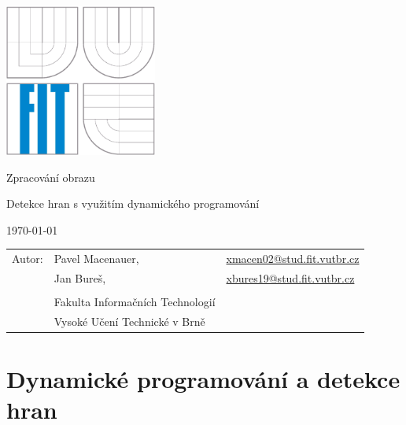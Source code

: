 \documentclass[12pt,a4paper,titlepage,final]{report}
\makeatletter
\newcommand\Course{Zpracování obrazu}
\newcommand\WorkTitle{Detekce hran s využitím dynamického programování}
\newcommand\AuthorA{Pavel Macenauer}
\newcommand\AuthorB{Jan Bureš}
\newcommand\AuthorAEmail{xmacen02@stud.fit.vutbr.cz}
\newcommand\AuthorBEmail{xbures19@stud.fit.vutbr.cz}
\newcommand\Faculty{Fakulta Informačních Technologií}
\newcommand\School{Vysoké Učení Technické v Brně}
\makeatother
\begin{document}
	\begin{titlepage}
	\begin{center}
		\includegraphics[height=5cm]{images/logo.eps}
	\end{center}
	\vfill
	\begin{center}
		\begin{Large}
			\Course\\
		\end{Large}
		\bigskip
		\begin{Huge}
			\WorkTitle\\
		\end{Huge}
	\end{center}
	\vfill
	\begin{center}
		\begin{large}
			\today
		\end{large}
	\end{center}
	\vfill
	\begin{flushleft}
		\begin{large}
			\begin{tabular}{lll}
				Autor: & \AuthorA, & \url{\AuthorAEmail} \\
				& \AuthorB, & \url{\AuthorBEmail} \\
		
				& & \\
				& \Faculty \\
				& \School \\
			\end{tabular}
		\end{large}
	\end{flushleft}
\end{titlepage}		

	
	
\tableofcontents

\newpage
\section{Dynamické programování a detekce hran}
\end{document}

